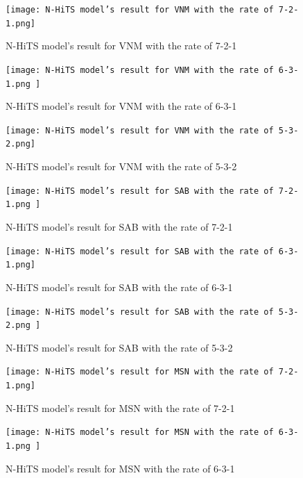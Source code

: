\documentclass{ieeeojies}
\begin{document}
    \begin{figure}[H]
    \begin{minipage}{0.23\textwidth}
    \centering
    \texttt{[image: N-HiTS model’s result for VNM with the rate of 7-2-1.png]}
    \caption{N-HiTS model’s result for VNM with the rate of 7-2-1}
    \end{minipage}
    \hfill
    \begin{minipage}{0.23\textwidth}
    \centering
    \texttt{[image: N-HiTS model’s result for VNM with the rate of 6-3-1.png ]}
    \caption{N-HiTS model’s result for VNM with the rate of 6-3-1}
    \end{minipage}
    \end{figure}

    \begin{figure}[H]
    \begin{minipage}{0.23\textwidth}
    \centering
    \texttt{[image: N-HiTS model’s result for VNM with the rate of 5-3-2.png]}
    \caption{N-HiTS model’s result for VNM with the rate of 5-3-2}
    \end{minipage}
    \hfill
    \begin{minipage}{0.23\textwidth}
    \centering
    \texttt{[image: N-HiTS model’s result for SAB with the rate of 7-2-1.png ]}
    \caption{N-HiTS model’s result for SAB with the rate of 7-2-1}
    \end{minipage}
    \end{figure}

    \begin{figure}[H]
    \begin{minipage}{0.23\textwidth}
    \centering
    \texttt{[image: N-HiTS model’s result for SAB with the rate of 6-3-1.png]}
    \caption{N-HiTS model’s result for SAB with the rate of 6-3-1}
    \end{minipage}
    \hfill
    \begin{minipage}{0.23\textwidth}
    \centering
    \texttt{[image: N-HiTS model’s result for SAB with the rate of 5-3-2.png ]}
    \caption{N-HiTS model’s result for SAB with the rate of 5-3-2}
    \end{minipage}
    \end{figure}

    \begin{figure}[H]
    \begin{minipage}{0.23\textwidth}
    \centering
    \texttt{[image: N-HiTS model’s result for MSN with the rate of 7-2-1.png]}
    \caption{N-HiTS model’s result for MSN with the rate of 7-2-1}
    \end{minipage}
    \hfill
    \begin{minipage}{0.23\textwidth}
    \centering
    \texttt{[image: N-HiTS model’s result for MSN with the rate of 6-3-1.png ]}
    \caption{N-HiTS model’s result for MSN with the rate of 6-3-1}
    \end{minipage}
    \end{figure}
\end{document}
